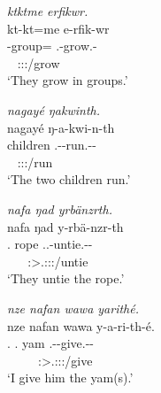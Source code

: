 \begin{exe}
\ex
\label{ex148}
\begin{xlist}
	\ex \textit{ktktme erfikwr.}\\
	\glll kt-kt=me e-rfik-wr\\
	 \Redup-group={\Ins} \Stnsg{}.\Alph{}-grow.{\Ext}-{\Ndu}\\
	 ~ {\footnotesize \Stpl:\Sbj:\Nonpast:\Ipfv/grow}\\
	\trans `They grow in groups.'
	\label{ex149}

	\ex \textit{nagayé ŋakwinth.}\\
	\glll nagayé ŋ-a-kwi-n-th\\
	 children \M{}.\Alph{}-{\Vc}-run.{\Ext}-{\Du}-\Stnsg{}\\
	  ~ {\footnotesize \Stdu:\Sbj:\Nonpast:\Ipfv/run}\\
	\trans `The two children run.'
	\label{ex150}

	\ex \textit{nafa ŋad yrbänzrth.}\\
	\glll nafa ŋad y-rbä-nzr-th\\
	 \Tnsg{}.{\Erg} rope \Tsg.\Masc.\Alph{}-untie.{\Ext}-{\Ndu}-\Stnsg{}\\
	  ~ ~ {\footnotesize \Stpl:\Sbj>\Tsg.\Masc:\Obj:\Nonpast:\Ipfv/untie}\\
	\trans `They untie the rope.'
	\label{ex151}

	\ex \textit{nze nafan wawa yarithé.}\\
	\glll nze nafan wawa y-a-ri-th-é.\\
	 \Fsg{}.{\Erg} \Tsg.{\Dat} yam \Tsg\Masc.\Alph{}-\Vc-give.{\Ext}-{\Ndu}-\Fsg{}\\
	  ~ ~ ~ {\footnotesize \Fsg:\Sbj>\Tsg.\Masc:\Io:\Nonpast:\Ipfv/give}\\
	\trans `I give him the yam(s).'
	\label{ex152}
\end{xlist}
\end{exe}


